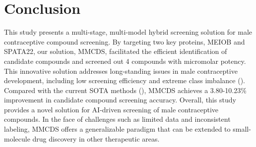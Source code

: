 \documentclass[unnumsec,webpdf,contemporary,large]{oup-authoring-template}%
\theoremstyle{thmstyleone}%
\theoremstyle{thmstyletwo}%
\theoremstyle{thmstylethree}%
\begin{document}
\section*{Conclusion}
This study presents a multi-stage, multi-model hybrid screening solution for male contraceptive compound screening. By targeting two key proteins, MEIOB and SPATA22, our solution, MMCDS, facilitated the efficient identification of candidate compounds and screened out 4 compounds with micromolar potency. This innovative solution addresses long-standing issues in male contraceptive development, including low screening efficiency and extreme class imbalance (\citealt{54,55,56}). Compared with the current SOTA methods (\citealt{57,58}), MMCDS achieves a 3.80-10.23\% improvement in candidate compound screening accuracy. Overall, this study provides a novel solution for AI-driven screening of male contraceptive compounds. In the face of challenges such as limited data and inconsistent labeling, MMCDS offers a generalizable paradigm that can be extended to small-molecule drug discovery in other therapeutic areas.



\end{document}
